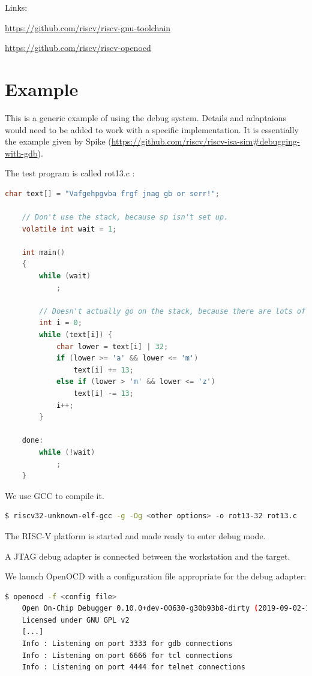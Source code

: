 \documentclass{article}
\begin{document}
	Links:
	
	\url{https://github.com/riscv/riscv-gnu-toolchain}
	
	\url{https://github.com/riscv/riscv-openocd}
	
	
	\newpage
	\section{Example}
	
	This is a generic example of using the debug system. Details and adaptaions would need to be added to work with a specific implementation. It is essentially the example given by Spike (\url{https://github.com/riscv/riscv-isa-sim#debugging-with-gdb}).
	
	The test program is called rot13.c :
	
	\begin{lstlisting}[language=C]
	char text[] = "Vafgehpgvba frgf jnag gb or serr!";
	
	// Don't use the stack, because sp isn't set up.
	volatile int wait = 1;
	
	int main()
	{
	    while (wait)
	        ;
	
	    // Doesn't actually go on the stack, because there are lots of GPRs.
	    int i = 0;
	    while (text[i]) {
	        char lower = text[i] | 32;
	        if (lower >= 'a' && lower <= 'm')
	            text[i] += 13;
	        else if (lower > 'm' && lower <= 'z')
	            text[i] -= 13;
	        i++;
	    }
	
	done:
	    while (!wait)
	        ;
	}
    \end{lstlisting}
    
    We use GCC to compile it.
    
    \begin{lstlisting}[language=bash]
	$ riscv32-unknown-elf-gcc -g -Og <other options> -o rot13-32 rot13.c
    \end{lstlisting}
    
    The RISC-V platform is started and made ready to enter debug mode.
    
    A JTAG debug adapter is connected between the workstation and the target.
    
    We launch OpenOCD with a configuration file appropriate for the debug adapter:
    
    \begin{lstlisting}[language=bash]
	$ openocd -f <config file>
	Open On-Chip Debugger 0.10.0+dev-00630-g30b93b8-dirty (2019-09-02-16:40)
	Licensed under GNU GPL v2
	[...]
	Info : Listening on port 3333 for gdb connections
	Info : Listening on port 6666 for tcl connections
	Info : Listening on port 4444 for telnet connections
    \end{lstlisting}
    
\end{document}
